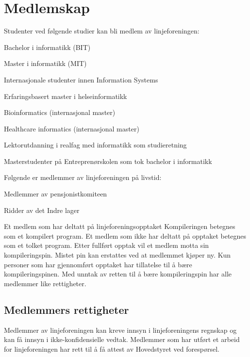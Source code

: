 \chapter{Medlemskap}
\label{chap:medlemskap}
Studenter ved følgende studier kan bli medlem av linjeforeningen: 
\begin{liste}
	\item Bachelor i informatikk (BIT)
	\item Master i informatikk (MIT)
	\item Internasjonale studenter innen Information Systems
	\item Erfaringsbasert master i helseinformatikk		%
	\item Bioinformatics (internasjonal master)		%
	\item Healthcare informatics (internasjonal master)	%
	\item Lektorutdanning i realfag med informatikk som studieretning %
	\item Masterstudenter på Entreprenørskolen som tok bachelor i informatikk %
\end{liste} 
Følgende er medlemmer av linjeforeningen på livstid:
\begin{liste}
	\item Medlemmer av pensjonistkomiteen
	\item Ridder av det Indre lager
\end{liste}

Et medlem som har deltatt på linjeforeningsopptaket Kompileringen betegnes som et kompilert program. Et medlem som ikke har deltatt på opptaket betegnes som et tolket program. Etter fullført opptak vil et medlem motta sin kompileringspin. Mistet pin kan erstattes ved at medlemmet kjøper ny. Kun personer som har gjennomført opptaket har tillatelse til å bære kompileringspinen. Med unntak av retten til å bære kompileringspin har alle medlemmer like rettigheter. %

\section{Medlemmers rettigheter}

Medlemmer av linjeforeningen kan kreve innsyn i linjeforeningens regnskap og kan få innsyn i ikke-konfidensielle vedtak. Medlemmer som har utført et arbeid for linjeforeningen har rett til å få attest av Hovedstyret ved forespørsel.

